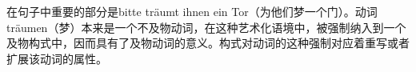 在句子中重要的部分是bitte träumt ihnen ein Tor（为他们梦一个门）。动词träumen（梦）本来是一个不及物动词，在这种艺术化语境中，被强制纳入到一个及物构式中，因而具有了及物动词的意义。构式对动词的这种强制对应着重写或者扩展该动词的属性。

